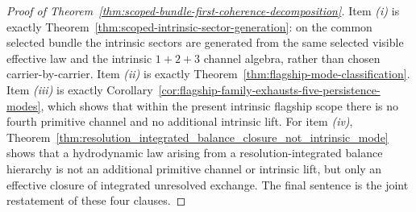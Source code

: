 \begin{proof}[Proof of Theorem~\ref{thm:scoped-bundle-first-coherence-decomposition}]
\label{proof:thm:scoped-bundle-first-coherence-decomposition}
Item \emph{(i)} is exactly
Theorem~\ref{thm:scoped-intrinsic-sector-generation}: on the common selected
bundle the intrinsic sectors are generated from the same selected visible
effective law and the intrinsic \(1+2+3\) channel algebra, rather than chosen
carrier-by-carrier. Item \emph{(ii)} is exactly
Theorem~\ref{thm:flagship-mode-classification}. Item \emph{(iii)} is exactly
Corollary~\ref{cor:flagship-family-exhausts-five-persistence-modes}, which
shows that within the present intrinsic flagship scope there is no fourth
primitive channel and no additional intrinsic lift. For item \emph{(iv)},
Theorem~\ref{thm:resolution_integrated_balance_closure_not_intrinsic_mode}
shows that a hydrodynamic law arising from a resolution-integrated balance
hierarchy is not an additional primitive channel or intrinsic lift, but only
an effective closure of integrated unresolved exchange. The final sentence is
the joint restatement of these four clauses.
\end{proof}

